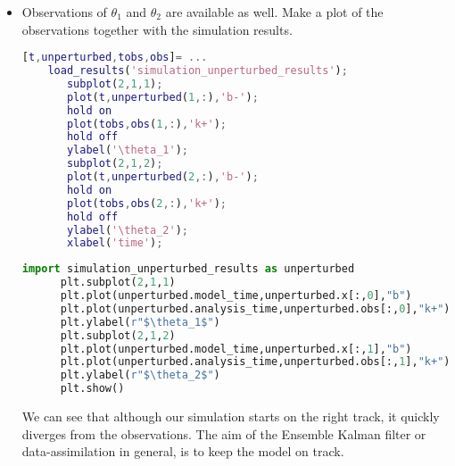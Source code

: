 \begin{itemize}
      \begin{lstlisting}[language=Python,frame=single,caption={Python}]
      import ensemble
      import simulation_ensemble_results as res
      (t,ens)=ensemble.reshape_ensemble(res)
      ens1=ens[:,0,:] #note we start counting at 0
      ens2=ens[:,1,:]
      plt.subplot(2,1,1)
      plt.plot(t[1:],ens1,"b")
      plt.ylabel(r"$\theta_1$")
      plt.subplot(2,1,2)
      plt.plot(t[1:],ens2,"b")
      plt.ylabel(r"$\theta_2$")
      plt.show()
      \end{lstlisting}
      
      \item Observations of $\theta_1$ and $\theta_2$ are available as well. Make a plot of
      the observations together with the simulation results.
\ifshowmatlab
      \begin{lstlisting}[language=Matlab,frame=single,caption={Matlab}]
	[t,unperturbed,tobs,obs]= ...
	load_results('simulation_unperturbed_results');
       subplot(2,1,1);
       plot(t,unperturbed(1,:),'b-');
       hold on
       plot(tobs,obs(1,:),'k+');
       hold off
       ylabel('\theta_1');
       subplot(2,1,2);
       plot(t,unperturbed(2,:),'b-');
       hold on
       plot(tobs,obs(2,:),'k+');
       hold off
       ylabel('\theta_2');
       xlabel('time');
      \end{lstlisting}
\fi
      \begin{lstlisting}[language=Python,frame=single,caption={Python}]
      import simulation_unperturbed_results as unperturbed
      plt.subplot(2,1,1)
      plt.plot(unperturbed.model_time,unperturbed.x[:,0],"b") 
      plt.plot(unperturbed.analysis_time,unperturbed.obs[:,0],"k+")
      plt.ylabel(r"$\theta_1$")
      plt.subplot(2,1,2)
      plt.plot(unperturbed.model_time,unperturbed.x[:,1],"b")
      plt.plot(unperturbed.analysis_time,unperturbed.obs[:,1],"k+")
      plt.ylabel(r"$\theta_2$")
      plt.show()
      \end{lstlisting}
      
      We can see that although our simulation starts on the right track, it quickly diverges from the observations.
      The aim of the Ensemble Kalman filter or data-assimilation in general, is to keep the model on track. 
      \end{itemize}
